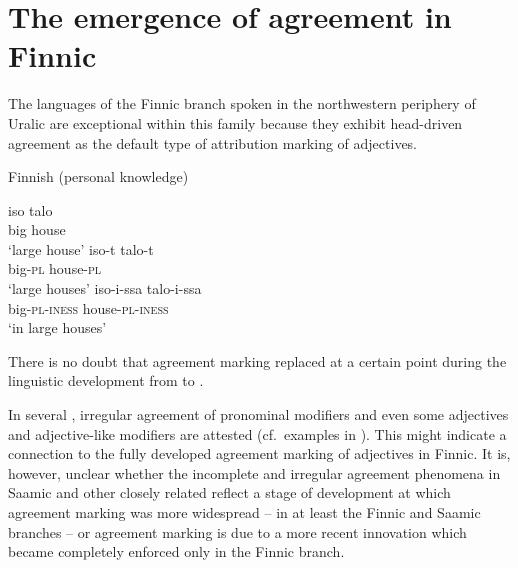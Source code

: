 {\section[Agreement in Finnic]{The emergence of agreement in Finnic} \label{Finnic diachr}
The languages of the Finnic branch spoken in the northwestern periphery of Uralic are exceptional within this family because they exhibit head\hyp{}driven agreement as the default type of attribution marking of adjectives.
\begin{exe}
\ex \rm{Finnish (personal knowledge)}
\begin{xlist}
\ex
\gll	iso talo\\
	big house\\
\glt	‘large house’
\ex	
\gll	iso-t talo-t\\
	big-\textsc{pl} house-\textsc{pl}\\
\glt	‘large houses’
\ex	
\gll	iso-i-ssa	talo-i-ssa\\
	big-\textsc{pl}-\textsc{iness} house-\textsc{pl}-\textsc{iness}\\
\glt	‘in large houses’
\end{xlist}
\end{exe}
There is no doubt that agreement marking replaced  at a certain point during the linguistic development from  to .

In several , irregular agreement of pronominal modifiers and even some adjectives and adjective-like modifiers are attested (cf.~examples in \citealt{honti1997}). This might indicate a connection to the fully developed agreement marking of adjectives in Finnic. It is, however, unclear whether the incomplete and irregular agreement phenomena in Saamic and other closely related  reflect a stage of development at which agreement marking was more widespread – in at least the Finnic and Saamic branches – or agreement marking is due to a more recent innovation which became completely enforced only in the Finnic branch. 

}

